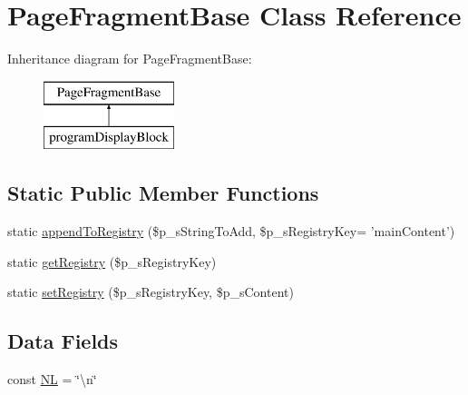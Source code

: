 \hypertarget{class_page_fragment_base}{\section{Page\-Fragment\-Base Class Reference}
\label{class_page_fragment_base}
}
Inheritance diagram for Page\-Fragment\-Base\-:\begin{figure}[H]
\begin{center}
\leavevmode
\includegraphics[height=2.000000cm]{class_page_fragment_base}
\end{center}
\end{figure}
\subsection*{Static Public Member Functions}
\begin{DoxyCompactItemize}
\item 
static \hyperlink{class_page_fragment_base_a0ebe09bd9f1f77ba934cb294606e010a}{append\-To\-Registry} (\$p\-\_\-s\-String\-To\-Add, \$p\-\_\-s\-Registry\-Key= 'main\-Content')
\item 
static \hyperlink{class_page_fragment_base_a86cc978fc5c3f2428380e6b9cad87b52}{get\-Registry} (\$p\-\_\-s\-Registry\-Key)
\item 
static \hyperlink{class_page_fragment_base_a5cb82f6d34119ef797d1820a5d3d585e}{set\-Registry} (\$p\-\_\-s\-Registry\-Key, \$p\-\_\-s\-Content)
\end{DoxyCompactItemize}
\subsection*{Data Fields}
\begin{DoxyCompactItemize}
\item 
const \hyperlink{class_page_fragment_base_a3948c042f5024ab0264a5413294eff6a}{N\-L} = \char`\"{}\textbackslash{}n\char`\"{}
\end{DoxyCompactItemize}


